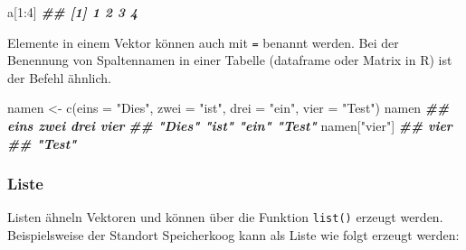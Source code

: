 \documentclass[
]{article}
\newenvironment{Shaded}{\begin{snugshade}}{\end{snugshade}}
\newcommand{\AttributeTok}[1]{\textcolor[rgb]{0.77,0.63,0.00}{#1}}
\newcommand{\DecValTok}[1]{\textcolor[rgb]{0.00,0.00,0.81}{#1}}
\newcommand{\DocumentationTok}[1]{\textcolor[rgb]{0.56,0.35,0.01}{\textbf{\textit{#1}}}}
\newcommand{\FunctionTok}[1]{\textcolor[rgb]{0.00,0.00,0.00}{#1}}
\newcommand{\NormalTok}[1]{#1}
\newcommand{\OtherTok}[1]{\textcolor[rgb]{0.56,0.35,0.01}{#1}}
\newcommand{\SpecialCharTok}[1]{\textcolor[rgb]{0.00,0.00,0.00}{#1}}
\newcommand{\StringTok}[1]{\textcolor[rgb]{0.31,0.60,0.02}{#1}}
\begin{document}
\begin{Shaded}
\begin{Highlighting}[]
\NormalTok{a[}\DecValTok{1}\SpecialCharTok{:}\DecValTok{4}\NormalTok{]}
\DocumentationTok{\#\# [1] 1 2 3 4}
\end{Highlighting}
\end{Shaded}

Elemente in einem Vektor können auch mit \texttt{=} benannt werden. Bei der Benennung von Spaltennamen in einer Tabelle (dataframe oder Matrix in R) ist der Befehl ähnlich.

\begin{Shaded}
\begin{Highlighting}[]
\NormalTok{namen }\OtherTok{\textless{}{-}} \FunctionTok{c}\NormalTok{(}\AttributeTok{eins =} \StringTok{"Dies"}\NormalTok{, }\AttributeTok{zwei =} \StringTok{"ist"}\NormalTok{, }\AttributeTok{drei =} \StringTok{"ein"}\NormalTok{, }\AttributeTok{vier =} \StringTok{"Test"}\NormalTok{)}
\NormalTok{namen}
\DocumentationTok{\#\#   eins   zwei   drei   vier }
\DocumentationTok{\#\# "Dies"  "ist"  "ein" "Test"}
\NormalTok{namen[}\StringTok{"vier"}\NormalTok{]}
\DocumentationTok{\#\#   vier }
\DocumentationTok{\#\# "Test"}
\end{Highlighting}
\end{Shaded}

\hypertarget{liste}{%
\subsubsection{Liste}\label{liste}}

Listen ähneln Vektoren und können über die Funktion \texttt{list()} erzeugt werden. Beispielsweise der Standort Speicherkoog kann als Liste wie folgt erzeugt werden:

\begin{Shaded}
\end{Shaded}
\end{document}
